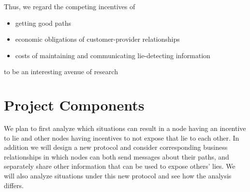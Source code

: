 \documentclass[12pt]{article}
\begin{document}
  Thus, we regard the competing incentives of
\begin{itemize}
\item getting good paths
\item economic obligations of customer-provider relationships
\item costs of maintaining and communicating lie-detecting information
\end{itemize}
to be an interesting avenue of research

  \section{Project Components}
  We plan to first analyze which situations can result in a node having an incentive to lie and other nodes having incentives to not expose that lie to each other. In addition we will design a new protocol and consider corresponding business relationships in which nodes can both send messages about their paths, and separately share other information that can be used to expose others' lies. We will also analyze situations under this new protocol and see how the analysis differs.




{}

\end{document}
